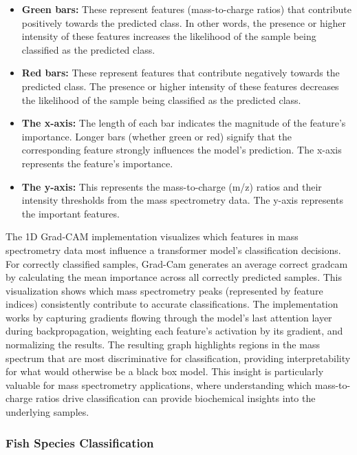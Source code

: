 \begin{itemize}
    \item \textbf{Green bars:} These represent features (mass-to-charge ratios) that contribute positively towards the predicted class. In other words, the presence or higher intensity of these features increases the likelihood of the sample being classified as the predicted class.
    \item \textbf{Red bars:} These represent features that contribute negatively towards the predicted class. The presence or higher intensity of these features decreases the likelihood of the sample being classified as the predicted class.
    \item \textbf{The x-axis:} The length of each bar indicates the magnitude of the feature's importance. Longer bars (whether green or red) signify that the corresponding feature strongly influences the model's prediction. The x-axis represents the feature's importance.
    \item \textbf{The y-axis:} This represents the mass-to-charge (m/z) ratios and their intensity thresholds from the mass spectrometry data. The y-axis represents the important features.
\end{itemize}

The 1D Grad-CAM \citep{Selvaraju2017} implementation visualizes which features in mass spectrometry data most influence a transformer model's classification decisions. For correctly classified samples, Grad-Cam generates an average correct gradcam by calculating the mean importance across all correctly predicted samples. This visualization shows which mass spectrometry peaks (represented by feature indices) consistently contribute to accurate classifications. The implementation works by capturing gradients flowing through the model's last attention layer during backpropagation, weighting each feature's activation by its gradient, and normalizing the results. The resulting graph highlights regions in the mass spectrum that are most discriminative for classification, providing interpretability for what would otherwise be a black box model. This insight is particularly valuable for mass spectrometry applications, where understanding which mass-to-charge ratios drive classification can provide biochemical insights into the underlying samples.

\subsubsection{Fish Species Classification}
\label{sec:transformer-on-fish-speciation}

